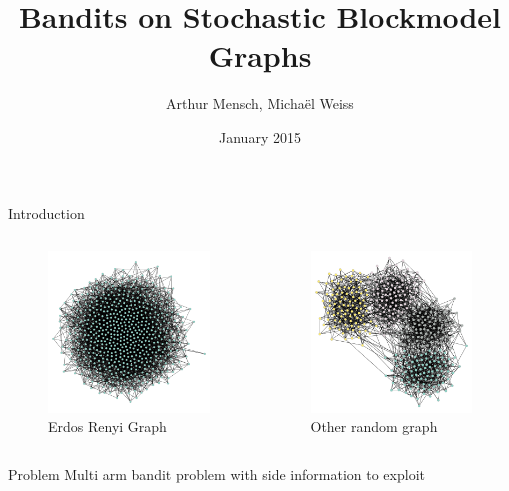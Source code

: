 \documentclass[11pt]{beamer}
\author{Arthur Mensch, Michaël Weiss}
\title{Bandits on Stochastic Blockmodel Graphs}
\institute{Reinforcement Learning}
\date{January 2015}
\begin{document}
\begin{frame}
\titlepage
\end{frame}

\begin{frame}{Introduction}
\begin{columns}
	\begin{column}{.5\textwidth}
		\begin{figure}[ht]
			\centering
			\includegraphics[width=.6\textwidth]{blockmodel3}
			\caption{Erdos Renyi Graph}
		\end{figure}
	\end{column}
	\begin{column}{.5\textwidth}
	\begin{figure}[ht]
		\centering
		\includegraphics[width=.6\textwidth]{blockmodel1}
		\caption{Other random graph}
	\end{figure}
	\end{column}
\end{columns}
\begin{block}{Problem}
Multi arm bandit problem with side information to exploit
\end{block}
\end{frame}
\end{document}
